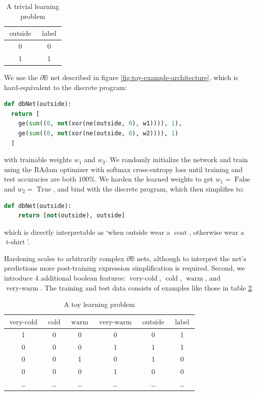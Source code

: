 \documentclass{article} %
\begin{document}
\begin{table}[h!]
	\centering
	\begin{tabular}{|c|c|}
		$\operatorname{outside}$ & $\operatorname{label}$ \\ \hline
		0       & 0     \\
		1       & 1    
	\end{tabular}
	\caption{A trivial learning problem}
	\label{tab:toy1}
\end{table}

We use the $\partial\mathbb{B}$ net described in figure \ref{fig:toy-example-architecture}, which is hard-equivalent to the discrete program:

\begin{lstlisting}[language=Python,style=mystyle,frame=single]
def dbNet(outside):
  return [
    ge(sum((0, not(xor(ne(outside, 0), w1)))), 1),
	ge(sum((0, not(xor(ne(outside, 0), w2)))), 1)
  ]
\end{lstlisting}

with trainable weights $w_{1}$ and $w_{2}$. We randomly initialize the network and train using the RAdam optimizer \citep{Liu2020On} with softmax cross-entropy loss until training and test accuracies are both $100\%$. We harden the learned weights to get $w_{1} = \operatorname{False}$ and $w_{2} = \operatorname{True}$, and bind with the discrete program, which then simplifies to:

\begin{lstlisting}[language=Python,style=mystyle,frame=single]
def dbNet(outside):
	return [not(outside), outside]
\end{lstlisting}

which is directly interpretable as `when outside wear a $\operatorname{coat}$, otherwise wear a $\operatorname{t-shirt}$'.

Hardening scales to arbitrarily complex $\partial\mathbb{B}$ nets, although to interpret the net's predictions more post-training expression simplification is required. Second, we introduce 4 additional boolean features: $\operatorname{very-cold}$, $\operatorname{cold}$, $\operatorname{warm}$, and $\operatorname{very-warm}$. The training and test data consists of examples like those in table \ref{tab:toy2}.

\begin{table}[h!]
	\centering
	\begin{tabular}{|c|c|c|c|c|c|}
		$\operatorname{very-cold}$ & $\operatorname{cold}$ & $\operatorname{warm}$ & $\operatorname{very-warm}$ & $\operatorname{outside}$ & $\operatorname{label}$ \\ \hline
		1 & 0 & 0 & 0 & 0 & 1 \\
		0 & 0 & 0 & 1 & 1 & 1 \\
		0 & 0 & 1 & 0 & 1 & 0 \\
		0 & 0 & 0 & 1 & 0 & 0 \\
		\dots & \dots & \dots & \dots & \dots & \dots
	\end{tabular}
	\caption{A toy learning problem}
	\label{tab:toy2}
\end{table}
\end{document}
